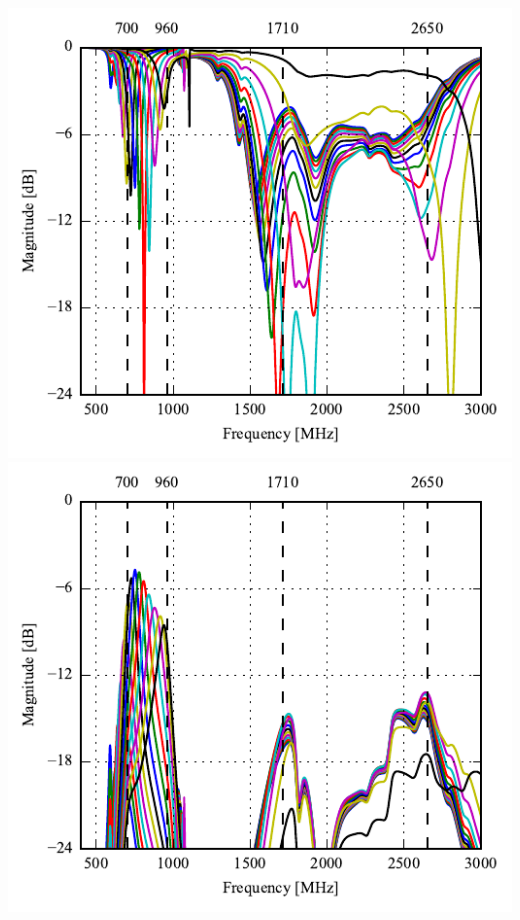 \begin{frame}
\begin{minipage}[t]{0.49\linewidth}
    \includegraphics[width=0.78\linewidth]{img/henrik/dp/s22_side_sweep.pdf} \\
    \includegraphics[width=0.78\linewidth]{img/henrik/dp/s21_side_sweep.pdf} 

  \end{minipage}    



\end{frame}

